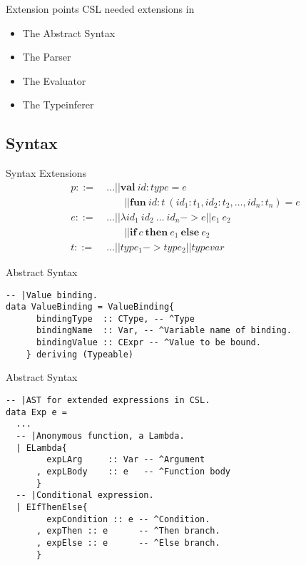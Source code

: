 \documentclass{beamer}
\newcommand{\kw}[1]{\mathbf{#1}}
\begin{document}
\begin{frame}{Extension points}
CSL needed extensions in
\begin{itemize}
  \item The Abstract Syntax
  \item The Parser
  \item The Evaluator
  \item The Typeinferer
\end{itemize}
\end{frame}

\subsection*{Syntax}

\begin{frame}{Syntax Extensions}
  \begin{align*}%
    p ::= &~ \ldots || \kw{val}~ id : type = e \tag{CSL statements} \\
       & \quad\quad || \kw{fun}~ id : t~ (id_1 : t_1, id_2 : t_2, \ldots, id_n : t_n) = e  \\
    e ::= &~ \ldots || \lambda id_1~ id_2~ \ldots~ id_n -> e || e_1\ e_2  \tag{CSL predicates}\\
       & \quad\quad || \kw{if}~ c~ \kw{then}~ e_1~ \kw{else}~ e_2 \\
    t ::= &~ \ldots || type_1 -> type_2 ||
    typevar \tag{CSL types}
  \end{align*}
\end{frame}

\begin{frame}[fragile]{Abstract Syntax}

\begin{verbatim}
-- |Value binding.
data ValueBinding = ValueBinding{
      bindingType  :: CType, -- ^Type
      bindingName  :: Var, -- ^Variable name of binding.
      bindingValue :: CExpr -- ^Value to be bound.
    } deriving (Typeable)
\end{verbatim}

\end{frame}

\begin{frame}[fragile]{Abstract Syntax}

\begin{verbatim}
-- |AST for extended expressions in CSL.
data Exp e =
  ...
  -- |Anonymous function, a Lambda.
  | ELambda{
        expLArg     :: Var -- ^Argument
      , expLBody    :: e   -- ^Function body
      }
  -- |Conditional expression.
  | EIfThenElse{
        expCondition :: e -- ^Condition.
      , expThen :: e      -- ^Then branch.
      , expElse :: e      -- ^Else branch.
      }
\end{verbatim}
\end{frame}
\end{document}
